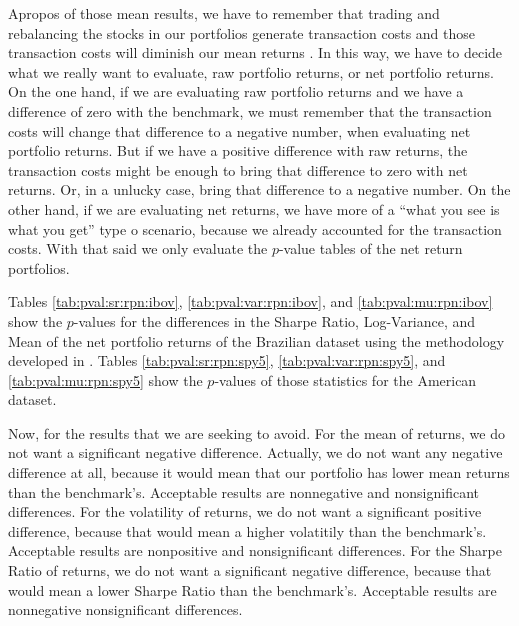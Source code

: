 \documentclass[12pt,oneside,a4paper]{memoir}
\begin{document}
Apropos of those mean results, we have to remember that trading and rebalancing the stocks in our portfolios generate transaction costs and those transaction costs will diminish our mean returns \cite{barber-2000}.
In this way, we have to decide what we really want to evaluate, raw portfolio returns, or net portfolio returns.
On the one hand, if we are evaluating raw portfolio returns and we have a difference of zero with the benchmark, we must remember that the transaction costs will change that difference to a negative number, when evaluating net portfolio returns.
But if we have a positive difference with raw returns, the transaction costs might be enough to bring that difference to zero with net returns.
Or, in a unlucky case, bring that difference to a negative number.
On the other hand, if we are evaluating net returns, we have more of a ``what you see is what you get'' type o scenario, because we already accounted for the transaction costs.
With that said we only evaluate the $p$-value tables of the net return portfolios.


Tables 
\ref{tab:pval:sr:rpn:ibov},
\ref{tab:pval:var:rpn:ibov}, and 
\ref{tab:pval:mu:rpn:ibov}
show the $p$-values for the differences in the Sharpe Ratio, Log-Variance, and Mean of the net portfolio returns of the Brazilian dataset using the methodology developed in .
Tables 
\ref{tab:pval:sr:rpn:spy5},  
\ref{tab:pval:var:rpn:spy5}, and
\ref{tab:pval:mu:rpn:spy5} 
show the $p$-values of those statistics for the American dataset.


Now, for the results that we are seeking to avoid.
For the mean of returns, we do not want a significant negative difference.
Actually, we do not want any negative difference at all,
because it would mean that our portfolio has lower mean returns than the benchmark's. 
Acceptable results are nonnegative and nonsignificant differences.
For the volatility of returns, we do not want a significant positive difference,
because that would mean a higher volatitily than the benchmark's.
Acceptable results are nonpositive and nonsignificant differences.
For the Sharpe Ratio of returns, we do not want a significant negative difference,
because that would mean a lower Sharpe Ratio than the benchmark's.
Acceptable results are nonnegative nonsignificant differences.
\end{document}
